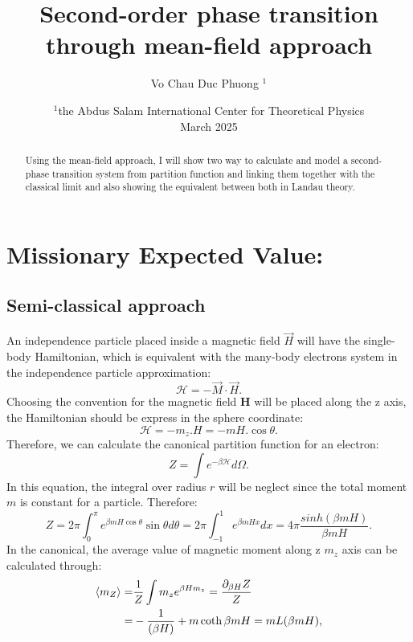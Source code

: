 \documentclass[a4paper]{article}
\title{Second-order phase transition through mean-field approach}
\author{Vo Chau Duc Phuong $^1$}
\date{$^1$the Abdus Salam International Center for Theoretical Physics\vspace{4pt}\\March 2025}
\begin{document}
	\maketitle
	\begin{abstract}
Using the mean-field approach, I will show two way to calculate and model a second-phase transition system from partition function and linking them together with the classical limit and also showing the equivalent between both in Landau theory.
	\end{abstract}
\section{Missionary Expected Value:} %
	\subsection{Semi-classical approach}
\quad An independence particle placed inside a magnetic field \(\vec{H}\) will have the single-body Hamiltonian, which is equivalent with the many-body electrons system in the independence particle approximation:
	\begin{equation}
		\mathcal{H} = - \vec{M} \cdot \vec{H}.
	\end{equation}
\quad Choosing the convention for the magnetic field \(\textbf{H}\) will be placed along the z axis, the Hamiltonian should be express in the sphere coordinate:
	\begin{equation}
		\mathcal{H} = - m_z.H = -mH . \cos \theta.
	\end{equation}
\quad Therefore, we can calculate the canonical partition function for an electron:
	\begin{equation}
		Z = \int e^{-\beta \mathcal{H}} d\Omega.
	\end{equation}
\quad In this equation, the integral over radius \(r\) will be neglect since the total moment \(m\) is constant for a particle. Therefore:
	\begin{equation}
		Z = 2\pi \int_{0}^\pi e^{\beta m H \cos \theta } \sin \theta d\theta= 2\pi \int_{-1}^{1} e^{\beta m H x} dx = 4\pi \frac{sinh(\beta m H)}{\beta m H}.
	\end{equation}
\quad In the canonical, the average value of magnetic moment along z  \(m_z\) axis can be calculated through:
	\begin{align}
		\ev{m_Z} =& \frac{1}{Z} \int m_z e^{\beta H m_z} = \frac{\partial_{\beta H}Z}{Z}\\
		=& -\frac{1}{(\beta H)} + m\coth\beta m H = m L(\beta m H),
	\end{align}
\end{document}
